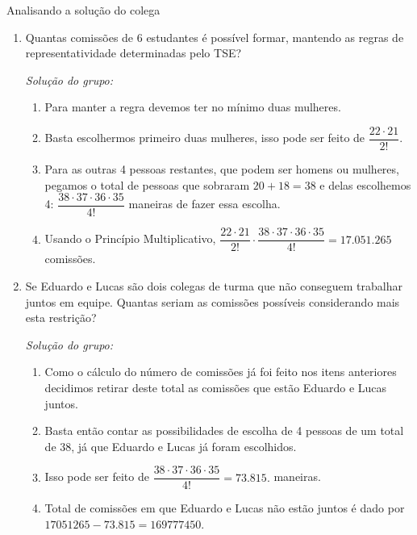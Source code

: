\begin{task}{Analisando a solução do colega}
\begin{enumerate}
\item Quantas comissões de 6 estudantes é possível formar, mantendo as regras de representatividade determinadas pelo TSE?


\textit{Solução do grupo:}

\begin{enumerate}[label=\titem{\arabic*.}]
\item Para manter a regra devemos ter no mínimo duas mulheres. 
\item Basta escolhermos primeiro duas mulheres, isso pode ser feito de $\dfrac{22 \cdot 21}{2!}$.
\item Para as outras 4 pessoas restantes, que podem ser homens ou mulheres, pegamos o total de pessoas que sobraram $20+18=38$ e delas escolhemos 4:
$\dfrac{38 \cdot 37\cdot 36 \cdot 35}{4!}$ maneiras de fazer essa escolha. 
\item Usando o Princípio Multiplicativo, $\dfrac{22 \cdot 21}{2!} \cdot \dfrac{38 \cdot 37 \cdot36 \cdot 35}{4!}= 17.051.265$ comissões.
\end{enumerate}

\item Se Eduardo e Lucas são dois colegas de turma que não conseguem trabalhar juntos em equipe. Quantas seriam as comissões possíveis considerando mais esta restrição? 


\textit{Solução do grupo:}

\begin{enumerate}[label=\titem{\arabic*.}]
\item Como o cálculo do número de comissões já foi feito nos itens anteriores decidimos retirar deste total as comissões que estão Eduardo e Lucas juntos. 
\item Basta então contar as possibilidades de escolha de 4 pessoas de um total de 38, já que Eduardo e Lucas já foram escolhidos. 
\item Isso pode ser feito de $\dfrac{38 \cdot 37 \cdot 36 \cdot 35}{4!} = 73.815.$ maneiras. 
\item Total de comissões em que Eduardo e Lucas não estão juntos é dado por $17051265-73.815=169777450.$
\end{enumerate}
\end{enumerate}

\end{task}

